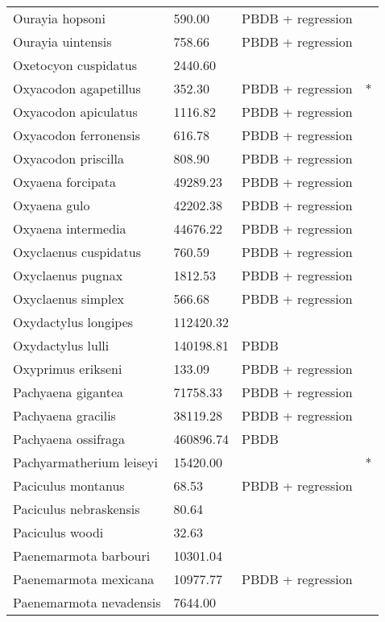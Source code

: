 \documentclass{article}
\begin{document}
\begin{center}
\begin{longtable}{p{} p{} p{} p{}}
    Ourayia hopsoni & 590.00 & PBDB + regression &  \\ 
    Ourayia uintensis & 758.66 & PBDB + regression &  \\ 
    Oxetocyon cuspidatus & 2440.60 & \cite{Tomiya2013} &  \\ 
    Oxyacodon agapetillus & 352.30 & PBDB + regression & * \\ 
    Oxyacodon apiculatus & 1116.82 & PBDB + regression &  \\ 
    Oxyacodon ferronensis & 616.78 & PBDB + regression &  \\ 
    Oxyacodon priscilla & 808.90 & PBDB + regression &  \\ 
    Oxyaena forcipata & 49289.23 & PBDB + regression &  \\ 
    Oxyaena gulo & 42202.38 & PBDB + regression &  \\ 
    Oxyaena intermedia & 44676.22 & PBDB + regression &  \\ 
    Oxyclaenus cuspidatus & 760.59 & PBDB + regression &  \\ 
    Oxyclaenus pugnax & 1812.53 & PBDB + regression &  \\ 
    Oxyclaenus simplex & 566.68 & PBDB + regression &  \\ 
    Oxydactylus longipes & 112420.32 & \cite{Tomiya2013} &  \\ 
    Oxydactylus lulli & 140198.81 & PBDB &  \\ 
    Oxyprimus erikseni & 133.09 & PBDB + regression &  \\ 
    Pachyaena gigantea & 71758.33 & PBDB + regression &  \\ 
    Pachyaena gracilis & 38119.28 & PBDB + regression &  \\ 
    Pachyaena ossifraga & 460896.74 & PBDB &  \\ 
    Pachyarmatherium leiseyi & 15420.00 & \cite{McDonald2005} & * \\ 
    Paciculus montanus & 68.53 & PBDB + regression &  \\ 
    Paciculus nebraskensis & 80.64 & \cite{Tomiya2013} &  \\ 
    Paciculus woodi & 32.63 & \cite{Korth1993} &  \\ 
    Paenemarmota barbouri & 10301.04 & \cite{Tomiya2013} &  \\ 
    Paenemarmota mexicana & 10977.77 & PBDB + regression &  \\ 
    Paenemarmota nevadensis & 7644.00 & \cite{McKenna2011} &  \\ 

\end{longtable}
\end{center}
\end{document}
